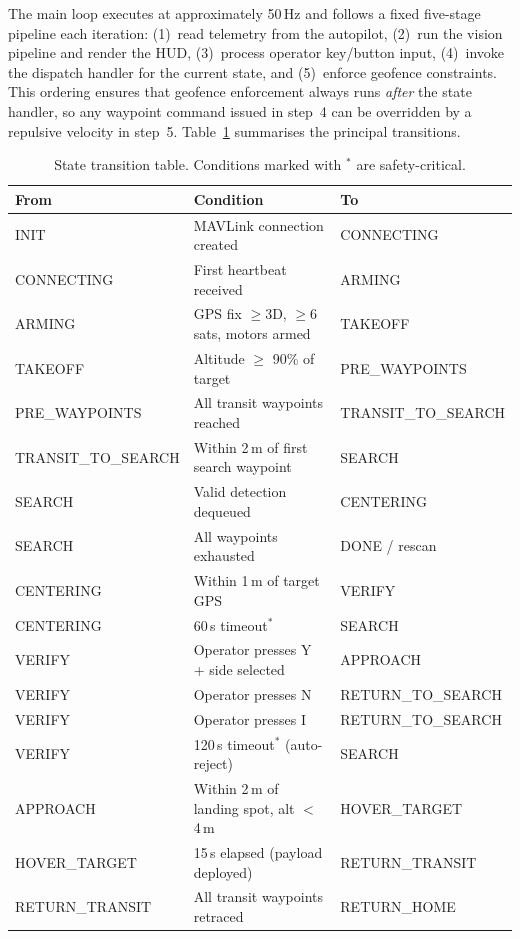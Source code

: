 The main loop executes at approximately 50\,Hz and follows a fixed five-stage pipeline each iteration: (1)~read telemetry from the autopilot, (2)~run the vision pipeline and render the HUD, (3)~process operator key/button input, (4)~invoke the dispatch handler for the current state, and (5)~enforce geofence constraints. This ordering ensures that geofence enforcement always runs \emph{after} the state handler, so any waypoint command issued in step~4 can be overridden by a repulsive velocity in step~5. Table~\ref{tab:transitions} summarises the principal transitions.

\begin{table}[htbp]
\centering
\caption{State transition table. Conditions marked with $^*$ are safety-critical.}
\label{tab:transitions}
\small
\begin{tabular}{lll}
\toprule
\textbf{From} & \textbf{Condition} & \textbf{To} \\
\midrule
INIT & MAVLink connection created & CONNECTING \\
CONNECTING & First heartbeat received & ARMING \\
ARMING & GPS fix $\geq$3D, $\geq$6 sats, motors armed & TAKEOFF \\
TAKEOFF & Altitude $\geq$ 90\% of target & PRE\_WAYPOINTS \\
PRE\_WAYPOINTS & All transit waypoints reached & TRANSIT\_TO\_SEARCH \\
TRANSIT\_TO\_SEARCH & Within 2\,m of first search waypoint & SEARCH \\
SEARCH & Valid detection dequeued & CENTERING \\
SEARCH & All waypoints exhausted & DONE / rescan \\
CENTERING & Within 1\,m of target GPS & VERIFY \\
CENTERING & 60\,s timeout$^*$ & SEARCH \\
VERIFY & Operator presses Y + side selected & APPROACH \\
VERIFY & Operator presses N & RETURN\_TO\_SEARCH \\
VERIFY & Operator presses I & RETURN\_TO\_SEARCH \\
VERIFY & 120\,s timeout$^*$ (auto-reject) & SEARCH \\
APPROACH & Within 2\,m of landing spot, alt $<$ 4\,m & HOVER\_TARGET \\
HOVER\_TARGET & 15\,s elapsed (payload deployed) & RETURN\_TRANSIT \\
RETURN\_TRANSIT & All transit waypoints retraced & RETURN\_HOME \\

\end{tabular}
\end{table}
